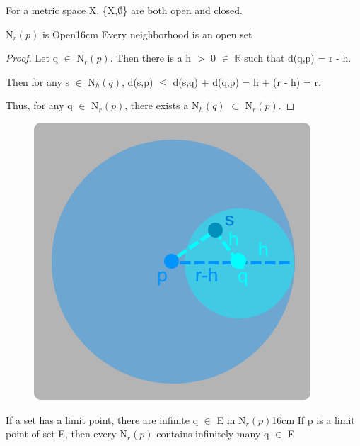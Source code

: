 	\hspace{0.7cm}
	For a metric space X, \{X,$\emptyset$\} are both open and closed.

	\vspace{0.5cm}



	\begin{wtheorem}{N$_r(p)$ is Open}{16cm}
		Every neighborhood is an open set
	\end{wtheorem}
	
	\begin{proof}
		Let q $\in$ N$_r(p)$. Then there is a h $>$ 0 $\in$ $\mathbb{R}$
		such that d(q,p) = r - h.

		Then for any s $\in$ N$_h(q)$,
		d(s,p) $\leq$  d(s,q) + d(q,p) = h + (r - h) = r.

		Thus, for any q $\in$ N$_r(p)$, there exists a N$_h(q)$ $\subset$ N$_r(p)$.
	\end{proof}



	\begin{figure}[h]
		\centering
		\includegraphics[scale=0.34]{Images/5.1.3.png}
	\end{figure}

	\newpage



	\begin{wtheorem}{If a set has a limit point, there are infinite q
	$\in$ E in N$_r(p)$}{16cm}
		If p is a limit point of set E, then every N$_r(p)$
		contains infinitely many q $\in$ E
	\end{wtheorem}
	
